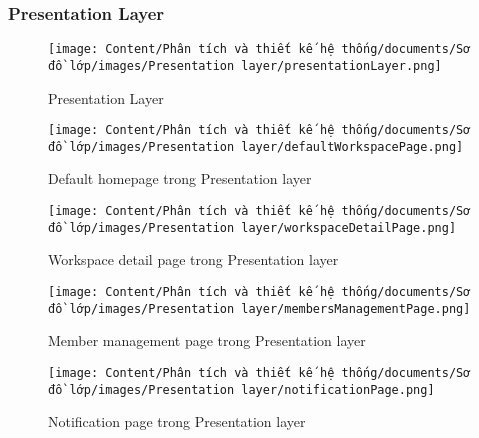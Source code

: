 \subsubsection{Presentation Layer}

\begin{figure}[H]
    \centering
    \texttt{[image: Content/Phân tích và thiết kế hệ thống/documents/Sơ đồ lớp/images/Presentation layer/presentationLayer.png]}
    \vspace{0.5cm}
    \caption{Presentation Layer}
    \label{fig:Presentation layer}
\end{figure}

\begin{figure}[H]
    \centering
    \texttt{[image: Content/Phân tích và thiết kế hệ thống/documents/Sơ đồ lớp/images/Presentation layer/defaultWorkspacePage.png]}
    \vspace{0.5cm}
    \caption{Default homepage trong Presentation layer}
    \label{fig:Default homepage trong Presentation layer}
\end{figure}

\begin{figure}[H]
    \centering
    \texttt{[image: Content/Phân tích và thiết kế hệ thống/documents/Sơ đồ lớp/images/Presentation layer/workspaceDetailPage.png]}
    \vspace{0.5cm}
    \caption{Workspace detail page trong Presentation layer}
    \label{fig:Workspace detail page trong Presentation layer}
\end{figure}

\begin{figure}[H]
    \centering
    \texttt{[image: Content/Phân tích và thiết kế hệ thống/documents/Sơ đồ lớp/images/Presentation layer/membersManagementPage.png]}
    \vspace{0.5cm}
    \caption{Member management page trong Presentation layer}
    \label{fig:Member management page trong Presentation layer}
\end{figure}

\begin{figure}[H]
    \centering
    \texttt{[image: Content/Phân tích và thiết kế hệ thống/documents/Sơ đồ lớp/images/Presentation layer/notificationPage.png]}
    \vspace{0.5cm}
    \caption{Notification page trong Presentation layer}
    \label{fig:Notification page trong Presentation layer}
\end{figure}


